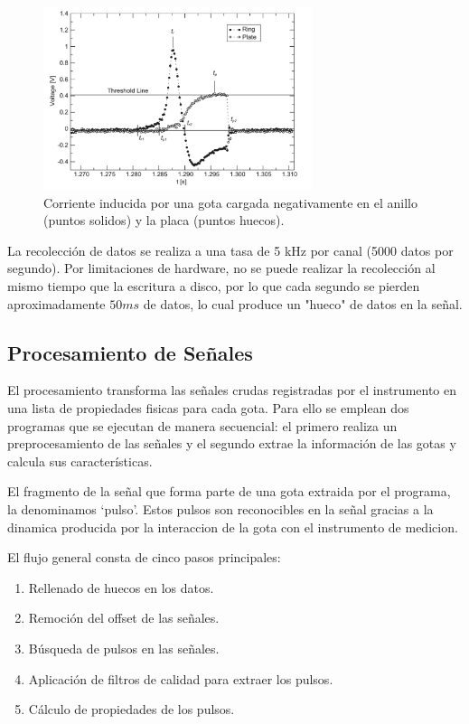 \documentclass[12pt,a4paper]{article}
\begin{document}
\begin{figure}[H]
    \centering
    \includegraphics[width=0.7\textwidth]{figures/corriente_gotas.png}
    \caption{Corriente inducida por una gota cargada negativamente en el anillo (puntos solidos) y la placa (puntos huecos).}
    \label{fig:corriente_gotas}
\end{figure}

La recolección de datos se realiza a una tasa de 5 kHz por canal (5000 datos por segundo). Por limitaciones de hardware, no se puede realizar la recolección al mismo tiempo que la escritura a disco, por lo que cada segundo se pierden aproximadamente $50ms$ de datos, lo cual produce un "hueco" de datos en la señal.

\subsection{Procesamiento de Señales}
\lhead{}

El procesamiento transforma las señales crudas registradas por el instrumento en una lista de propiedades fisicas para cada gota. Para ello se emplean dos programas que se ejecutan de manera secuencial: el primero realiza un preprocesamiento de las señales y el segundo extrae la información de las gotas y calcula sus características.

El fragmento de la señal que forma parte de una gota extraida por el programa, la denominamos `pulso'. Estos pulsos son reconocibles en la señal gracias a la dinamica producida por la interaccion de la gota con el instrumento de medicion.

El flujo general consta de cinco pasos principales:

\begin{enumerate}
    \item Rellenado de huecos en los datos.
    \item Remoción del offset de las señales.
    \item Búsqueda de pulsos en las señales.
    \item Aplicación de filtros de calidad para extraer los pulsos.
    \item Cálculo de propiedades de los pulsos.
\end{enumerate}
\end{document}
